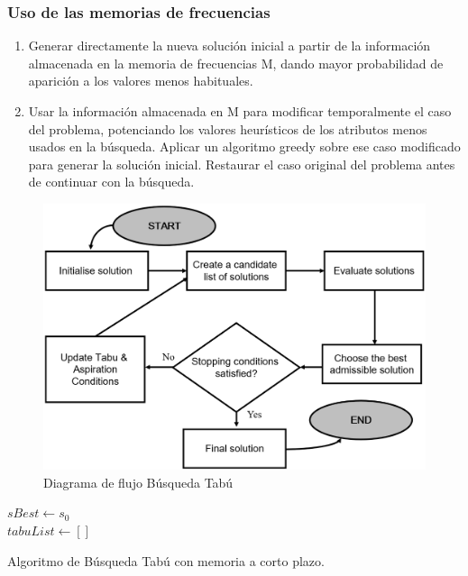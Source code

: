 \documentclass{llncs}
\begin{document}
\subsubsection{Uso de las memorias de frecuencias}
\begin{enumerate}
\item Generar directamente la nueva soluci\'{o}n inicial a partir de la informaci\'{o}n almacenada en la memoria de frecuencias M, dando mayor probabilidad de aparici\'{o}n a los valores menos habituales.
\item Usar la informaci\'{o}n almacenada en M para modificar temporalmente el caso del problema, potenciando los valores heur\'{i}sticos de los atributos menos usados en la b\'{u}squeda. Aplicar un algoritmo greedy sobre ese caso modificado para generar la soluci\'{o}n inicial. Restaurar el caso original del problema antes de continuar con la b\'{u}squeda.
\end{enumerate}

\begin{figure}[h]
\centering
\includegraphics[scale=0.6]{img/flujo.png}
\caption{Diagrama de flujo B\'{u}squeda Tab\'{u}}
\end{figure}


\begin{algorithm}[H]
	$sBest \gets s_0$\\
    $tabuList \gets []$\\
    \caption{Algoritmo de B\'{u}squeda Tab\'{u} con memoria a corto plazo.}
\end{algorithm}
\end{document}
